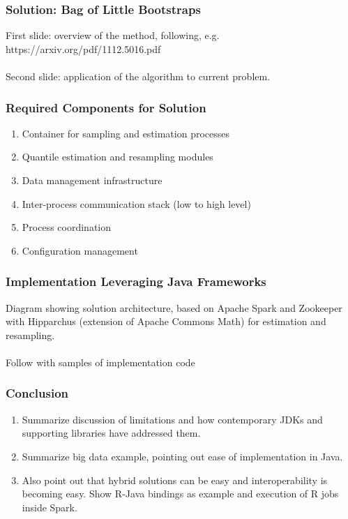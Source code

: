 \documentclass[14pt,mathserif]{beamer}
\begin{document}
\begin{frame}
  \frametitle{Solution: Bag of Little Bootstraps}
  First slide: overview of the method, following, e.g. 
  https://arxiv.org/pdf/1112.5016.pdf
  \\
  \\
  Second slide: application of the algorithm to current problem.
\end{frame} 

\begin{frame}
  \frametitle{Required Components for Solution}
  \begin{enumerate}
  \item Container for sampling and estimation processes
  \item Quantile estimation and resampling modules
  \item Data management infrastructure
  \item Inter-process communication stack (low to high level)
  \item Process coordination
  \item Configuration management
  \end{enumerate}
\end{frame}
  
\begin{frame}
  \frametitle{Implementation Leveraging Java Frameworks}
Diagram showing solution architecture, based on Apache Spark and Zookeeper with Hipparchus (extension of Apache Commons Math) for estimation and resampling.
\\
\\
Follow with samples of implementation code
\end{frame}

\begin{frame}
  \frametitle{Conclusion}
\begin{enumerate}
\item Summarize discussion of limitations and how contemporary JDKs and supporting libraries have addressed them.
\item Summarize big data example, pointing out ease of implementation in Java.  
\item Also point out that hybrid solutions can be easy and interoperability is becoming easy.  Show R-Java bindings as example and execution of R jobs inside Spark.
\end{enumerate}
\end{frame}
\end{document}
